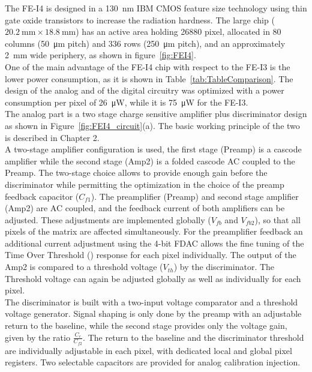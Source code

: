 The FE-I4 is designed in a \SI{130}{\nano\meter} IBM CMOS feature size technology using thin gate oxide transistors to increase the radiation hardness. The large chip ($\SI{20.2}{\milli\meter}\times\SI{18.8}{\milli\meter}$) has an active area holding 26880 pixel, allocated in 80 columns (\SI{50}{\micro\meter} pitch) and 336 rows (\SI{250}{\micro\meter} pitch), and an approximately \SI{2}{\milli\meter} wide periphery, as shown in figure~\ref{fig:FEI4}.\\
One of the main advantage of the FE-I4 chip with respect to the FE-I3 is the lower power consumption, as it is shown in Table~\ref{tab:TableComparison}. The design of the analog and of the digital circuitry was optimized with a power consumption per pixel of \SI{26}{\micro\watt}, while it is \SI{75}{\micro\watt} for the FE-I3.\\
The analog part is a two stage charge sensitive amplifier plus discriminator design as shown in Figure~\ref{fig:FEI4_circuit}(a). The basic working principle of the two is described in Chapter 2.\\
A two-stage amplifier configuration is used, the first stage (Preamp) is a cascode amplifier while the second stage (Amp2) is a folded cascode AC coupled to the Preamp. The two-stage choice allows to provide enough gain before the discriminator while permitting the optimization in the choice of the preamp feedback capacitor ($C_{f1}$).
The preamplifier (Preamp) and second stage amplifier (Amp2) are AC coupled, and the feedback current of both amplifiers can be adjusted. These adjustments are implemented globally ($V_{fb}$ and $V_{fb2}$), so that all pixels of the matrix are affected simultaneously. For the preamplifier feedback an additional current adjustment using the 4-bit FDAC allows the fine tuning of the Time Over Threshold (\tot) response for each pixel individually. The output of the Amp2 is compared to a threshold voltage ($V_{th}$) by the discriminator. The Threshold voltage can again be adjusted globally as well as individually for each pixel.\\
The discriminator is built with a two-input voltage comparator and a threshold voltage generator. Signal shaping is only done by the preamp with an adjustable return to the baseline, while the second stage provides only the voltage gain, given by the ratio $\frac{C_c}{C_{f2}}$. The return to the baseline and the discriminator threshold are individually adjustable in each pixel, with dedicated local and global pixel registers. Two selectable capacitors are provided for analog calibration injection.\\
